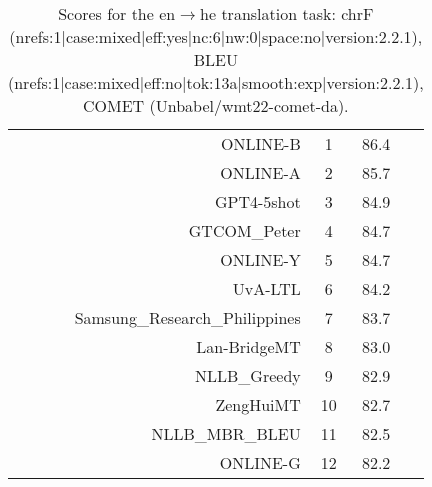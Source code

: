 \documentclass[11pt]{article}
\begin{document}
\begin{table}
\begin{subtable}[t]{0.33\textwidth}
\begin{tabular}{rccc}
\midrule 
ONLINE-B & 1 & 86.4 \\ 
ONLINE-A & 2 & 85.7 \\ 
GPT4-5shot & 3 & 84.9 \\ 
GTCOM\_Peter & 4 & 84.7 \\ 
ONLINE-Y & 5 & 84.7 \\ 
UvA-LTL & 6 & 84.2 \\ 
Samsung\_Research\_Philippines & 7 & 83.7 \\ 
Lan-BridgeMT & 8 & 83.0 \\ 
NLLB\_Greedy & 9 & 82.9 \\ 
ZengHuiMT & 10 & 82.7 \\ 
NLLB\_MBR\_BLEU & 11 & 82.5 \\ 
ONLINE-G & 12 & 82.2 \\ 
\bottomrule 
\end{tabular} 
\end{subtable} 
\caption{Scores for the en$\rightarrow$he translation task: chrF (nrefs:1|case:mixed|eff:yes|nc:6|nw:0|space:no|version:2.2.1), BLEU (nrefs:1|case:mixed|eff:no|tok:13a|smooth:exp|version:2.2.1), COMET (Unbabel/wmt22-comet-da).} 
\end{table} 
\end{document}
